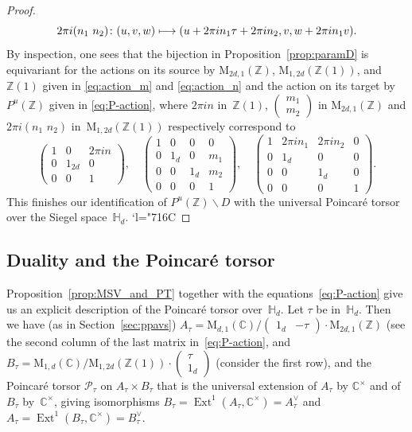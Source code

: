 \documentclass[JEP,XML,SOM,Unicode,NoFloatCountersInSection]{cedram}
\let\mathcal\mathscr
\newcommand{\Changelback}{\mathcode`l="716C}
\def\mto{\mathchoice{\longmapsto}{\mapsto}{\mapsto}{\mapsto}}
\let\oldvee\vee
\renewcommand{\vee}{{\scriptscriptstyle\oldvee}}
\theoremstyle{plain}
\theoremstyle{definition}
\numberwithin{equation}{subsection}
\renewcommand{\C}{\mathbb C}
\newcommand{\Z}{\mathbb Z}
\renewcommand{\H}{\mathbb H}
\newcommand{\calP}{\mathcal{P}}
\newcommand{\rmM}{\mathrm{M}}
\DeclareMathOperator{\Ext}{Ext}
\begin{document}
\begin{proof}
\begin{equation}
\label{eq:action_n}
2\pi i(n_1\,\, n_2)\colon (u,v,w)\mto
(u+2\pi i n_1\tau+2\pi i n_2, v, w+2\pi i n_1v).
\end{equation}
By inspection, one sees that the bijection in
Proposition~\ref{prop:paramD} is equivariant for the actions on its
source by $\rmM_{2d,1}(\Z)$, $\rmM_{1,2d}(\Z(1))$, and~$\Z(1)$ given
in \eqref{eq:action_m} and \eqref{eq:action_n} and the action on its
target by $P^u(\Z)$ given in \eqref{eq:P-action}, where $2\pi i n$
in~$\Z(1)$, $(\substack{m_1\\m_2})$ in $\rmM_{2d,1}(\Z)$ and $2\pi
i(n_1\,\, n_2)$ in~$\rmM_{1,2d}(\Z(1))$ respectively correspond to
\begin{equation}\label{eq:equiv-actions}
\begin{pmatrix}
1 & 0 & 2\pi in\\
0 & 1_{2d} & 0\\
0 & 0 & 1
\end{pmatrix},\quad
\begin{pmatrix}
1 & 0 & 0 & 0\\
0 & 1_d & 0 & m_1\\
0 & 0 & 1_d & m_2\\
0 & 0 & 0 & 1
\end{pmatrix},\quad
\begin{pmatrix}
1 & 2\pi in_1 & 2\pi in_2 & 0\\
0 & 1_d & 0 & 0\\
0 & 0 & 1_d & 0\\
0 & 0 & 0 & 1
\end{pmatrix}.
\end{equation}
This finishes our identification of $P^u(\Z)\backslash D$ with the
universal Poincaré torsor over the Siegel space~$\H_d$.
\Changelback
\end{proof}


\subsection{Duality and the Poincaré torsor}\label{sec4.7}
Proposition~\ref{prop:MSV_and_PT} together with the
equations~\eqref{eq:P-action} give us an explicit description of the
Poincaré torsor over~$\H_d$. Let $\tau$ be in~$\H_d$. Then we have
(as in Section~\ref{sec:ppavs})
$A_\tau=\rmM_{d,1}(\C)/ (\begin{matrix} 1_d &
-\tau\end{matrix}){\cdot}\rmM_{2d,1}(\Z)$ (see the second column of the
last matrix in~\eqref{eq:P-action}, and
$B_\tau=\rmM_{1,d}(\C)/\rmM_{1,2d}(\Z(1)){\cdot}(\substack{\tau\\1_d})$
(consider the first row), and the Poincaré torsor $\calP_\tau$ on
$A_\tau\times B_\tau$ that is the universal extension of $A_\tau$ by
$\C^\times$ and of $B_\tau$ by~$\C^\times$, giving isomorphisms
$B_\tau=\Ext^1(A_\tau,\C^\times)=A_\tau^\vee$ and
$A_\tau=\Ext^1(B_\tau,\C^\times)=B_\tau^\vee$.
\end{document}
